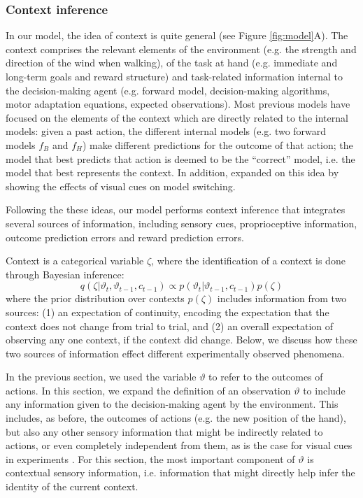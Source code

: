 \documentclass[a4paper,doc,floatsintext,natbib]{apa6}
\def \fref #1{Figure \ref{#1}}     %
\begin{document}
\subsubsection{Context inference}
In our model, the idea of context is quite general (see \fref{fig:model}A). The context comprises the relevant elements of the environment (e.g. the strength and direction of the wind when walking), of the task at hand (e.g. immediate and long-term goals and reward structure) and task-related information internal to the decision-making agent (e.g. forward model, decision-making algorithms, motor adaptation equations, expected observations). Most previous models \cite[e.g.][]{Wolpert_Multiple_1998,Imamizu_Neural_2008,Oh_Minimizing_2019} have focused on the elements of the context which are directly related to the internal models: given a past action, the different internal models (e.g. two forward models $f_B$ and $f_H$) make different predictions for the outcome of that action; the model that best predicts that action is deemed to be the ``correct'' model, i.e. the model that best represents the context. In addition, \cite{Imamizu_Explicit_2007} expanded on this idea by showing the effects of visual cues on model switching.

Following the these ideas, our model performs context inference that integrates several sources of information, including sensory cues, proprioceptive information, outcome prediction errors and reward prediction errors.

Context is a categorical variable $\zeta$, where the identification of a context is done through Bayesian inference:
\begin{equation}
q(\zeta | \vartheta_t, \vartheta_{t-1}, c_{t-1}) \propto p(\vartheta_t | \vartheta_{t-1}, c_{t-1})p(\zeta)
\label{eqn:context-inference-mini}
\end{equation}
where the prior distribution over contexts $p(\zeta)$ includes information from two sources: (1) an expectation of continuity, encoding the expectation that the context does not change from trial to trial, and (2) an overall expectation of observing any one context, if the context did change. Below, we discuss how these two sources of information effect different experimentally observed phenomena.

In the previous section, we used the variable $\vartheta$ to refer to the outcomes of actions. In this section, we expand the definition of an observation $\vartheta$ to include any information given to the decision-making agent by the environment. This includes, as before, the outcomes of actions (e.g. the new position of the hand), but also any other sensory information that might be indirectly related to actions, or even completely independent from them, as is the case for visual cues in experiments \cite[e.g.][]{Addou_Colored_2011}. For this section, the most important component of $\vartheta$ is contextual sensory information, i.e. information that might directly help infer the identity of the current context.
\end{document}
